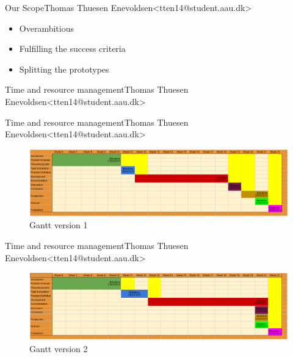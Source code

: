 \begin{frame}{Our Scope}{Thomas Thuesen Enevoldsen\newline<tten14@student.aau.dk>}
    \begin{itemize}
  	\item<2-> Overambitious
  	\item<3-> Fulfilling the success criteria
  	\item<4-> Splitting the prototypes
  \end{itemize}
\end{frame}

\begin{frame}{Time and resource management}{Thomas Thuesen Enevoldsen\newline<tten14@student.aau.dk>}

\end{frame}

\begin{frame}{Time and resource management}{Thomas Thuesen Enevoldsen\newline<tten14@student.aau.dk>}
		\begin{figure}[h!]
    	\includegraphics[width=1\textwidth]{images/gantt1.png}
    	\caption{Gantt version 1}
		\centering    		
	\end{figure}
\end{frame}

\begin{frame}{Time and resource management}{Thomas Thuesen Enevoldsen\newline<tten14@student.aau.dk>}
		\begin{figure}[h!]
    	\includegraphics[width=1\textwidth]{images/gantt2.png}
    	\caption{Gantt version 2}
		\centering    		
	\end{figure}
\end{frame}

